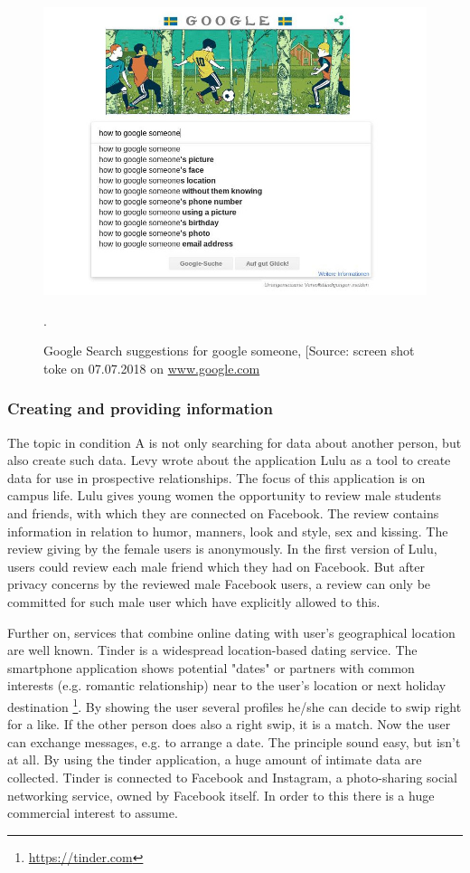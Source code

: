 \begin{figure}[htb]
  \centering
  \includegraphics[width=\linewidth]{img/how_to_google_someone.jpeg}
  \caption{Google Search suggestions for google someone, [Source: screen shot toke on 07.07.2018 on \url{www.google.com}}.
  \label{fig:how_to_google_someone}
\end{figure}

\subsubsection{Creating and providing information}
The topic in condition A is not only searching for data about another person, but also create such data. Levy \cite{levy2014intimate} wrote about the application Lulu as a tool to create data for use in prospective relationships. The focus of this application is on campus life. Lulu gives young women the opportunity to review male students and friends, with which they are connected on Facebook. The review contains information in relation to humor, manners, look and style, sex and kissing. The review giving by the female users is anonymously. In the first version of Lulu, users could review each male friend which they had on Facebook. But after privacy concerns by the reviewed male Facebook users, a review can only be committed for such male user which have explicitly allowed to this.

Further on, services that combine online dating with user's geographical location are well known. Tinder is a widespread location-based dating service. The smartphone application shows potential "dates" or partners with common interests (e.g. romantic relationship) near to the user's location or next holiday destination \footnote{\url{https://tinder.com}}. By showing the user several profiles he/she can decide to swip right for a like. If the other person does also a right swip, it is a match. Now the user can exchange messages, e.g. to arrange a date. The principle sound easy, but isn't at all. By using the tinder application, a huge amount of intimate data are collected. 
Tinder is connected to Facebook and Instagram, a photo-sharing social networking service, owned by Facebook itself. In order to this there is a huge commercial interest to assume.


